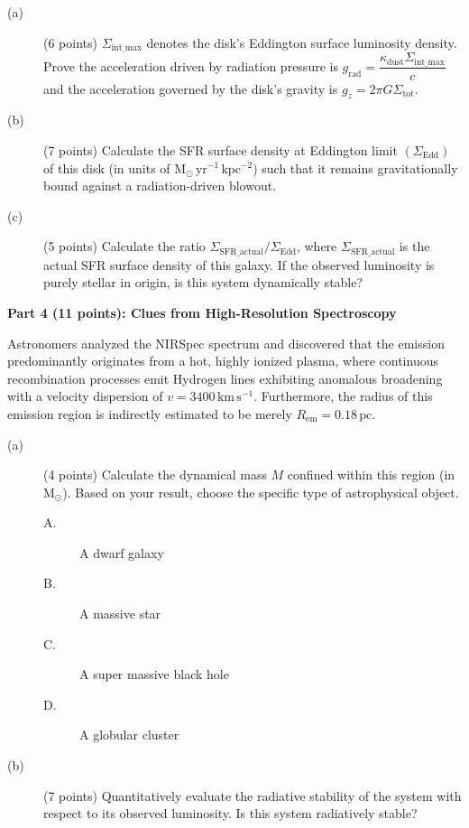 \begin{description}
\item[(a)] (6 points) $\Sigma_{\mathrm{int\_max}}$ denotes the disk's
  Eddington surface luminosity density. Prove the acceleration driven by
  radiation pressure is
  $g_{\mathrm{rad}} = \dfrac{\kappa_{\mathrm{dust}}\Sigma_{\mathrm{int\_max}}}{c}$
  and the acceleration governed by the disk's gravity is
  $g_z = 2\pi G \Sigma_{\mathrm{tot}}$.
\item[(b)] (7 points) Calculate the SFR surface density at Eddington limit
  $(\Sigma_{\mathrm{Edd}})$ of this disk (in units of
  $\mathrm{M_\odot\,yr^{-1}\,kpc^{-2}}$) such that it remains gravitationally
  bound against a radiation-driven blowout.
\item[(c)] (5 points) Calculate the ratio
  $\Sigma_{\mathrm{SFR\_actual}}/\Sigma_{\mathrm{Edd}}$, where
  $\Sigma_{\mathrm{SFR\_actual}}$ is the actual SFR surface density of this
  galaxy. If the observed luminosity is purely stellar in origin, is this
  system dynamically stable?
\end{description}

\medskip\noindent\textbf{Part 4 (11 points): Clues from High-Resolution Spectroscopy}

Astronomers analyzed the NIRSpec spectrum and discovered that the emission
predominantly originates from a hot, highly ionized plasma, where continuous
recombination processes emit Hydrogen lines exhibiting anomalous broadening
with a velocity dispersion of $v = 3400\,\mathrm{km\,s^{-1}}$. Furthermore,
the radius of this emission region is indirectly estimated to be merely
$R_{\mathrm{em}} = 0.18\,\mathrm{pc}$.

\begin{description}
\item[(a)] (4 points) Calculate the dynamical mass $M$ confined within this
  region (in $\mathrm{M}_\odot$). Based on your result, choose the specific
  type of astrophysical object.
  \begin{description}
  \item[A.] A dwarf galaxy
  \item[B.] A massive star
  \item[C.] A super massive black hole
  \item[D.] A globular cluster
  \end{description}
\item[(b)] (7 points) Quantitatively evaluate the radiative stability of the
  system with respect to its observed luminosity. Is this system radiatively
  stable?
\end{description}

